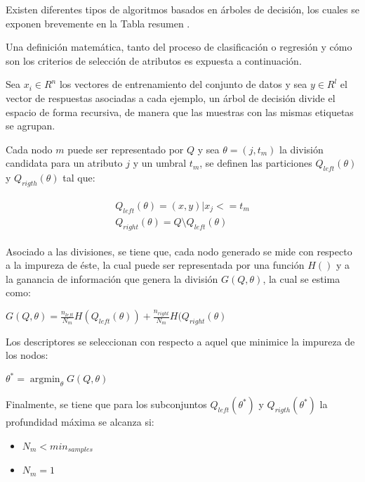 Existen diferentes tipos de algoritmos basados en árboles de decisión, los cuales se exponen brevemente en la Tabla resumen .

Una definición matemática, tanto del proceso de clasificación o regresión y cómo son los criterios de selección de atributos es expuesta a continuación.

Sea $x_{i} \in R^{n}$ los vectores de entrenamiento del conjunto de datos y sea $y \in R^l$ el vector de respuestas asociadas a cada ejemplo, un árbol de decisión divide el espacio de forma recursiva, de manera que las muestras con las mismas etiquetas se agrupan.

Cada nodo $m$ puede ser representado por $Q$ y sea $\theta = (j, t_{m})$ la división candidata para un atributo $j$ y un umbral $t_{m}$, se definen las particiones $Q_{left}(\theta)$ y $Q_{rigth}(\theta)$ tal que:

\begin{align}
	\begin{aligned}
		Q_{left}(\theta) = {(x, y) | x_j <= t_m}\\Q_{right}(\theta) = Q \setminus Q_{left}(\theta)
	\end{aligned}
\end{align}
 

Asociado a las divisiones, se tiene que, cada nodo generado se mide con respecto a la impureza de éste, la cual puede ser representada por una función $H()$ y a la ganancia de información que genera la división $G(Q, \theta)$, la cual se estima como:

\begin{center}
	$G(Q, \theta) = \frac{n_{left}}{N_m} H(Q_{left}(\theta))
+ \frac{n_{right}}{N_m} H(Q_{right}(\theta)$
\end{center}

Los descriptores se seleccionan con respecto a aquel que minimice la impureza de los nodos:

\begin{center}
	$\theta^* = \operatorname{argmin}_\theta  G(Q, \theta)$
\end{center}

Finalmente, se tiene que para los subconjuntos $Q_{left}(\theta^*)$ y $Q_{rigth}(\theta^*)$ la profundidad máxima se alcanza si:

\begin{itemize}
	
	\item $N_{m} < min_{samples}$ 
	
	\item $N_{m} = 1$
\end{itemize}

